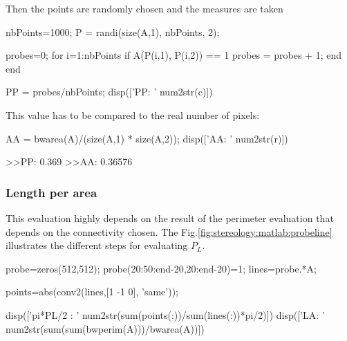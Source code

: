 Then the points are randomly chosen and the measures are taken
\begin{matlab}
nbPoints=1000;
P = randi(size(A,1), nbPoints, 2);

probes=0;
for i=1:nbPoints
    if A(P(i,1), P(i,2)) == 1
        probes = probes + 1;
    end
end

PP = probes/nbPoints;
disp(['PP: ' num2str(c)])
\end{matlab}

This value has to be compared to the real number of pixels:

\begin{matlab}
AA = bwarea(A)/(size(A,1) * size(A,2));
disp(['AA: ' num2str(r)])
\end{matlab}


\begin{mwindow}
>>PP: 0.369
>>AA: 0.36576
\end{mwindow}


\subsubsection{Length per area}
This evaluation highly depends on the result of the perimeter evaluation that depends on the connectivity chosen. The Fig.\ref{fig:stereology:matlab:probeline} illustrates the different steps for evaluating $P_L$.
\begin{matlab}
probe=zeros(512,512);
probe(20:50:end-20,20:end-20)=1;
lines=probe.*A;

points=abs(conv2(lines,[1 -1 0], 'same'));

disp(['pi*PL/2 : ' num2str(sum(points(:))/sum(lines(:))*pi/2)])
disp(['LA: ' num2str(sum(sum(bwperim(A)))/bwarea(A))])
\end{matlab}

